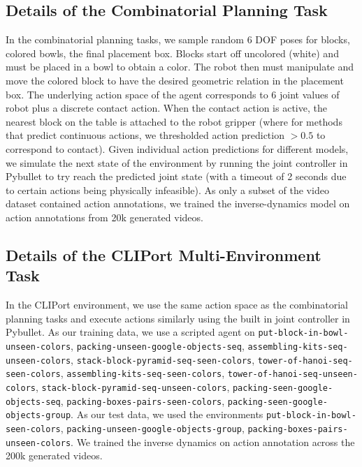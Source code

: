\subsection{Details of the Combinatorial Planning Task}

In the combinatorial planning tasks, we sample random 6 DOF poses for blocks, colored bowls, the final placement box.  Blocks start off uncolored (white) and must be placed in a bowl to obtain a color. The robot then must manipulate and move the colored block to have the desired geometric relation in the placement box. The underlying action space of the agent corresponds to 6 joint values of robot plus a discrete contact action. When the contact action is active, the nearest block on the table is attached to the robot gripper (where for methods that predict continuous actions, we thresholded action prediction $>0.5$ to correspond to contact). Given individual action predictions for different models, we simulate the next state of the environment by running the joint controller in Pybullet to try reach the predicted joint state (with a timeout of 2 seconds due to certain actions being physically infeasible).  As only a subset of the video dataset contained action annotations, we trained the inverse-dynamics model on action annotations from 20k generated videos. 

\subsection{Details of the CLIPort Multi-Environment Task}

In the CLIPort environment, we use the same action space as the combinatorial planning tasks and execute actions similarly using the built in joint controller in Pybullet. As our training data, we use a scripted agent on \texttt{put-block-in-bowl-unseen-colors}, \texttt{packing-unseen-google-objects-seq}, \texttt{assembling-kits-seq-unseen-colors}, \texttt{stack-block-pyramid-seq-seen-colors}, \texttt{tower-of-hanoi-seq-seen-colors}, \texttt{assembling-kits-seq-seen-colors}, \texttt{tower-of-hanoi-seq-unseen-colors}, \texttt{stack-block-pyramid-seq-unseen-colors}, \texttt{packing-seen-google-objects-seq}, \texttt{packing-boxes-pairs-seen-colors}, \texttt{packing-seen-google-objects-group}. As our test data, we used the environments \texttt{put-block-in-bowl-seen-colors}, \texttt{packing-unseen-google-objects-group}, \texttt{packing-boxes-pairs-unseen-colors}. We trained the inverse dynamics on action annotation across the 200k generated videos. 

